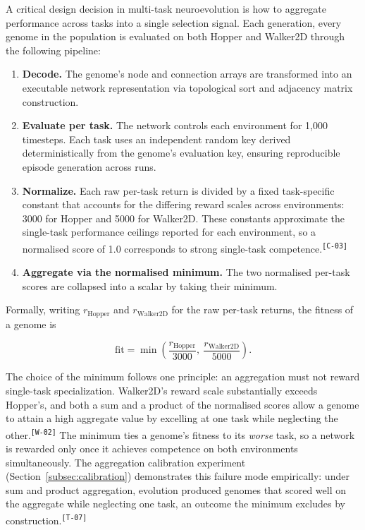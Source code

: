 \documentclass[12pt]{article}
\newcommand{\revID}[1]{\textsuperscript{\scriptsize\texttt{[#1]}}}
\newcommand{\revWrong}[2]{\textcolor{revRed}{#2}\revID{#1}}
\newcommand{\revWeak}[2]{\textcolor{revOrange}{#2}\revID{#1}}
\newcommand{\revStructure}[2]{\textcolor{revAmber}{#2}\revID{#1}}
\begin{document}
A critical design decision in multi-task neuroevolution is how to aggregate performance across tasks into a single selection signal.
Each generation, every genome in the population is evaluated on both Hopper and Walker2D through the following pipeline:

\begin{enumerate}
    \item \textbf{Decode.} The genome's node and connection arrays are transformed into an executable network representation via topological sort and adjacency matrix construction.
    \item \textbf{Evaluate per task.} The network controls each environment for 1,000 timesteps. Each task uses an independent random key derived deterministically from the genome's evaluation key, ensuring reproducible episode generation across runs.
    \item \textbf{Normalize.} Each raw per-task return is divided by a fixed task-specific constant that accounts for the differing reward scales across environments: 3000 for Hopper and 5000 for Walker2D. \revWeak{C-03}{These constants approximate the single-task performance ceilings reported for each environment, so a normalised score of 1.0 corresponds to strong single-task competence.}
    \item \textbf{Aggregate via the normalised minimum.} The two normalised per-task scores are collapsed into a scalar by taking their minimum.
\end{enumerate}

Formally, writing $r_{\text{Hopper}}$ and $r_{\text{Walker2D}}$ for the raw per-task returns, the fitness of a genome is

\[\text{fit} = \min\!\left(\frac{r_{\text{Hopper}}}{3000},\ \frac{r_{\text{Walker2D}}}{5000}\right).\]

The choice of the minimum follows one principle: an aggregation must not reward single-task specialization.
\revWrong{W-02}{Walker2D's reward scale substantially exceeds Hopper's, and both a sum and a product of the normalised scores allow a genome to attain a high aggregate value by excelling at one task while neglecting the other.}
The minimum ties a genome's fitness to its \emph{worse} task, so a network is rewarded only once it achieves competence on both environments simultaneously.
\revStructure{T-07}{The aggregation calibration experiment (Section~\ref{subsec:calibration}) demonstrates this failure mode empirically: under sum and product aggregation, evolution produced genomes that scored well on the aggregate while neglecting one task, an outcome the minimum excludes by construction.}
\end{document}
